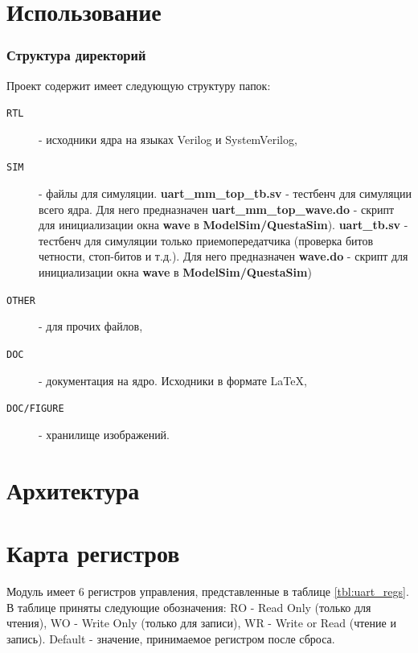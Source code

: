 \documentclass[a4paper,12pt]{article}
\begin{document}
\newpage
\section{Использование}
\subsubsection{Структура директорий}
  Проект содержит имеет следующую структуру папок:


\begin{description}
    \item[\texttt{RTL}] - исходники ядра на языках Verilog и SystemVerilog,
    \item[\texttt{SIM}] - файлы для симуляции. \textbf{uart\_mm\_top\_tb.sv} - тестбенч для симуляции всего ядра. Для него предназначен \textbf{uart\_mm\_top\_wave.do} - скрипт для инициализации окна \textbf{wave} в \textbf{ModelSim/QuestaSim}). \textbf{uart\_tb.sv} - тестбенч для симуляции только приемопередатчика (проверка битов четности, стоп-битов и т.д.). Для него предназначен \textbf{wave.do} - скрипт для инициализации окна \textbf{wave} в \textbf{ModelSim/QuestaSim})
    \item[\texttt{OTHER}] - для прочих файлов,
    \item[\texttt{DOC}] - документация на ядро. Исходники в формате \LaTeX,
    \item[\texttt{DOC/FIGURE}] - хранилище изображений.
\end{description}

\newpage
\section{Архитектура}


\newpage
\section{Карта регистров}

Модуль имеет 6 регистров управления, представленные в таблице {\ref{tbl:uart_regs}}. В таблице приняты следующие обозначения: RO - Read Only (только для чтения), WO - Write Only (только для записи), WR - Write or Read (чтение и запись). Default - значение, принимаемое регистром после сброса.
\end{document}
